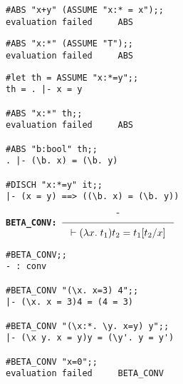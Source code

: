 
\vskip 4mm
\begin{session}\begin{verbatim}
#ABS "x+y" (ASSUME "x:* = x");;
evaluation failed     ABS
\end{verbatim}\end{session}

\vskip 7mm
\vskip 4mm
\begin{session}\begin{verbatim}
#ABS "x:*" (ASSUME "T");;
evaluation failed     ABS
\end{verbatim}\end{session}


\vskip 7mm
\begin{session}\begin{verbatim}
#let th = ASSUME "x:*=y";;
th = . |- x = y

#ABS "x:*" th;;
evaluation failed     ABS

#ABS "b:bool" th;;
. |- (\b. x) = (\b. y)

#DISCH "x:*=y" it;;
|- (x = y) ==> ((\b. x) = (\b. y))
\end{verbatim}\end{session}



\vskip10mm
\bspindent\LARGE\bf
{\Large\tt BETA\_CONV:\quad}
$\Rule{\mbox{-}}
{\vdash (\lambda x. \; t_1) t_2 = t_1 [ t_2 / x ] }$
\espindent


\vskip 7mm
\vskip 4mm
\begin{session}\begin{verbatim}
#BETA_CONV;;
- : conv

#BETA_CONV "(\x. x=3) 4";;
|- (\x. x = 3)4 = (4 = 3)

#BETA_CONV "(\x:*. \y. x=y) y";;
|- (\x y. x = y)y = (\y'. y = y')

#BETA_CONV "x=0";;
evaluation failed     BETA_CONV
\end{verbatim}\end{session}

